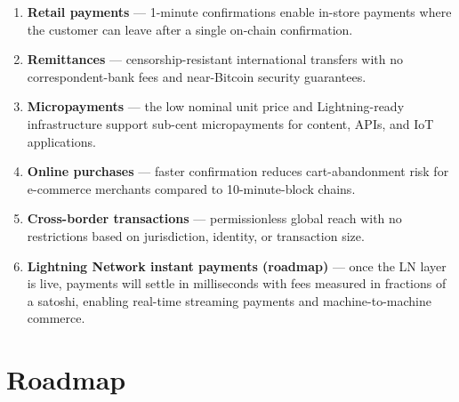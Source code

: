 \documentclass[12pt, a4paper]{article}
\begin{document}
\begin{enumerate}[leftmargin=*, label=\textbf{\arabic*.}]
  \item \textbf{Retail payments} — 1-minute confirmations enable in-store
        payments where the customer can leave after a single on-chain
        confirmation.

  \item \textbf{Remittances} — censorship-resistant international transfers
        with no correspondent-bank fees and near-Bitcoin security guarantees.

  \item \textbf{Micropayments} — the low nominal unit price and
        Lightning-ready infrastructure support sub-cent micropayments for
        content, APIs, and IoT applications.

  \item \textbf{Online purchases} — faster confirmation reduces cart-abandonment
        risk for e-commerce merchants compared to 10-minute-block chains.

  \item \textbf{Cross-border transactions} — permissionless global reach with
        no restrictions based on jurisdiction, identity, or transaction size.

  \item \textbf{Lightning Network instant payments (roadmap)} — once the LN
        layer is live, payments will settle in milliseconds with fees
        measured in fractions of a satoshi, enabling real-time streaming
        payments and machine-to-machine commerce.
\end{enumerate}

\newpage
\section{Roadmap}
\label{sec:roadmap}
\end{document}

